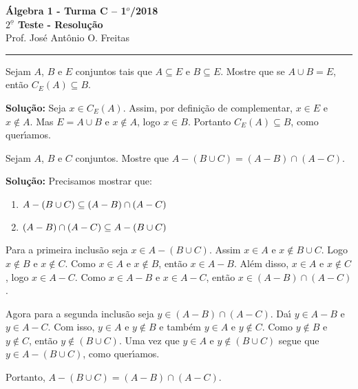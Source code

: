 \documentclass[12pt]{article}
\begin{document}


\begin{center}
{\Large\bf {\'A}lgebra 1 - Turma C -- 1$^{o}$/2018} \\ \vspace{9pt} {\large\bf
  $2^{\underline{o}}$ Teste - Resolu\c{c}\~ao}\\
\vspace{9pt} Prof. Jos{\'e} Ant{\^o}nio O. Freitas
\end{center}
\hrule

\vspace{.6cm}

\questao Sejam $A$, $B$ e $E$ conjuntos tais que $A \subseteq E$ e $B \subseteq E$. Mostre que se $A \cup B = E$, ent\~ao $C_E(A) \subseteq B$.

\noindent\textbf{Solu\c{c}\~ao:} Seja $x \in C_E(A)$. Assim, por defini\c{c}\~ao de complementar, $x \in E$ e $x \notin A$. Mas $E = A \cup B$ e $x \notin A$, logo $x \in B$. Portanto $C_E(A) \subseteq B$, como quer{\'\i}amos.

\vspace{.5cm}

\questao Sejam $A$, $B$ e $C$ conjuntos. Mostre que $A - (B \cup C) = (A - B) \cap (A - C)$.

\noindent\textbf{Solu\c{c}\~ao:} Precisamos mostrar que:
\begin{enumerate}[label={\roman*})]
	\item $A - (B \cup C) \subseteq (A - B) \cap (A - C)$
	\item $(A - B) \cap (A - C) \subseteq A - (B \cup C)$
\end{enumerate}

Para a primeira inclus\~ao seja $x \in A - (B \cup C)$. Assim $x \in A$ e $x \notin B \cup C$. Logo $x \notin B$ e $x \notin C$. Como $x \in A$ e $x \notin B$, ent\~ao $x \in A - B$. Al\'em disso, $x \in A$ e $x \notin C$, logo $x \in A - C$. Como $x \in A - B$ e $x \in A - C$, ent\~ao $x \in (A - B) \cap (A - C)$.

Agora para a segunda inclus\~ao seja $y \in (A - B) \cap (A - C)$. Da{\'\i} $y \in A - B$ e $y \in A - C$. Com isso, $y \in A$ e $y \notin B$ e tamb\'em $y \in A$ e $y \notin C$. Como $y \notin B$ e $y \notin C$, ent\~ao $y \notin (B \cup C)$. Uma vez que $y \in A$ e $y \notin (B \cup C)$ segue que $y \in A - (B \cup C)$, como quer{\'\i}amos.

Portanto, $A - (B \cup C) = (A - B) \cap (A - C)$.
\end{document}
